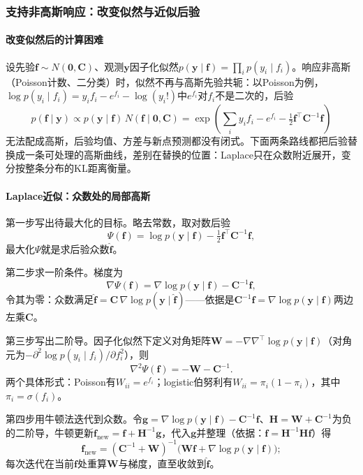 \subsubsection{支持非高斯响应：改变似然与近似后验}
\label{sec:regression-gp-nongaussian}

\paragraph{改变似然后的计算困难}

设先验$\bm f\sim N(\bm 0,\bm C)$、观测$\bm y$因子化似然$p(\bm y\mid\bm f)=\prod_i p(y_i\mid f_i)$。响应非高斯（Poisson计数、二分类）时，似然不再与高斯先验共轭：以Poisson为例，$\log p(y_i\mid f_i)=y_i f_i-e^{f_i}-\log(y_i!)$中$e^{f_i}$对$f_i$不是二次的，后验
\[
  p(\bm f\mid\bm y)\propto p(\bm y\mid\bm f)\,N(\bm f\mid\bm 0,\bm C)
  =\exp\!\left(\sum_i y_i f_i-e^{f_i}-\tfrac12\bm f^{\top}\bm C^{-1}\bm f\right)
\]
无法配成高斯，后验均值、方差与新点预测都没有闭式。下面两条路线都把后验替换成一条可处理的高斯曲线，差别在替换的位置：Laplace只在众数附近展开，变分按整条分布的KL距离衡量。

\paragraph{Laplace近似：众数处的局部高斯}

第一步写出待最大化的目标。略去常数，取对数后验
\[
  \Psi(\bm f)=\log p(\bm y\mid\bm f)-\tfrac12\bm f^{\top}\bm C^{-1}\bm f,
\]
最大化$\Psi$就是求后验众数$\widehat{\bm f}$。

第二步求一阶条件。梯度为
\[
  \nabla\Psi(\bm f)=\nabla\log p(\bm y\mid\bm f)-\bm C^{-1}\bm f,
\]
令其为零：众数满足$\widehat{\bm f}=\bm C\,\nabla\log p(\bm y\mid\widehat{\bm f})$——依据是$\bm C^{-1}\bm f=\nabla\log p(\bm y\mid\bm f)$两边左乘$\bm C$。

第三步写出二阶导。因子化似然下定义对角矩阵$\bm W=-\nabla\nabla^{\top}\log p(\bm y\mid\bm f)$（对角元为$-{\partial^2\log p(y_i\mid f_i)}/{\partial f_i^2}$），则
\[
  \nabla^2\Psi(\bm f)=-\bm W-\bm C^{-1}.
\]
两个具体形式：Poisson有$W_{ii}=e^{f_i}$；logistic伯努利有$W_{ii}=\pi_i(1-\pi_i)$，其中$\pi_i=\sigma(f_i)$。

第四步用牛顿法迭代到众数。令$\bm g=\nabla\log p(\bm y\mid\bm f)-\bm C^{-1}\bm f$、$\bm H=\bm W+\bm C^{-1}$为负的二阶导，牛顿更新$\bm f_{\text{new}}=\bm f+\bm H^{-1}\bm g$，代入$\bm g$并整理（依据：$\bm f=\bm H^{-1}\bm H\bm f$）得
\[
  \bm f_{\text{new}}=(\bm C^{-1}+\bm W)^{-1}\big(\bm W\bm f+\nabla\log p(\bm y\mid\bm f)\big);
\]
每次迭代在当前$\bm f$处重算$\bm W$与梯度，直至收敛到$\widehat{\bm f}$。

